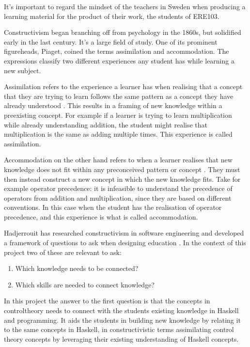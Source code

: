 It's important to regard the mindset of the teachers in Sweden when producing a learning material for the product of their work, the students of \gls{ERE103}.

Constructivism began branching off from psychology in the 1860s, but solidified early in the last century. It's a large field of study. One of its prominent figureheads, Piaget, coined the terms assimilation and accommodation. The expressions classify two different experiences any student has while learning a new subject. 

Assimilation refers to the experience a learner has when realising that a concept that they are trying to learn follows the same pattern as a concept they have already understood \cite[p.~283]{imsen_2005}. This results in a framing of new knowledge within a preexisting concept. For example if a learner is trying to learn multiplication while already understanding addition, the student might realise that multiplication is the same as adding multiple times. This experience is called assimilation. 

Accommodation on the other hand refers to when a learner realises that new knowledge does not fit within any preconceived pattern or concept \cite[p.~284]{imsen_2005}. They must then instead construct a new concept in which the new knowledge fits. Take for example operator precedence: it is infeasible to understand the precedence of operators from addition and multiplication, since they are based on different conventions. In this case when the student has the realisation of operator precedence, and this experience is what is called accommodation.

Hadjerrouit has researched constructivism in software engineering and developed a framework of questions to ask when designing education \cite{hadjerrouit2005}. In the context of this project 
two of these are relevant to ask:
\begin{enumerate}
    \item Which knowledge needs to be connected?
    \item Which skills are needed to connect knowledge?
\end{enumerate}

In this project the answer to the first question is that the concepts in \gls{controltheory} needs to connect with the students existing knowledge in \gls{Haskell} and programming. It aids the students in building new knowledge by relating it to the same concepts in \gls{Haskell}, in constructivistic terms assimilating control theory concepts by leveraging their existing understanding of \gls{Haskell} concepts.

